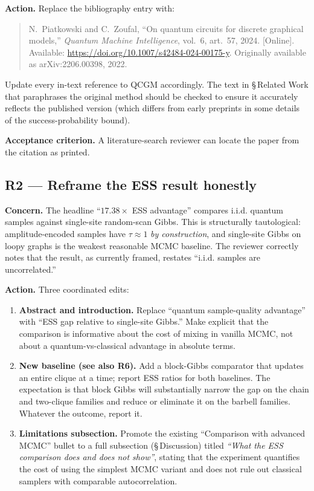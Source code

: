 \documentclass[conference,10pt]{IEEEtran}
\begin{document}
\textbf{Action.} Replace the bibliography entry with:
\begin{quote}\small
N.~Piatkowski and C.~Zoufal, ``On quantum circuits for discrete graphical
models,'' \emph{Quantum Machine Intelligence}, vol.~6, art.~57, 2024.
[Online]. Available: \url{https://doi.org/10.1007/s42484-024-00175-y}.
Originally available as arXiv:2206.00398, 2022.
\end{quote}
Update every in-text reference to QCGM accordingly. The text in
\S\,Related Work that paraphrases the original method should be checked
to ensure it accurately reflects the published version (which differs
from early preprints in some details of the success-probability bound).

\textbf{Acceptance criterion.} A literature-search reviewer can locate the
paper from the citation as printed.

\subsection{R2 --- Reframe the ESS result honestly}

\textbf{Concern.} The headline ``$17.38\times$ ESS advantage'' compares
i.i.d. quantum samples against single-site random-scan Gibbs. This is
structurally tautological: amplitude-encoded samples have $\tau \approx 1$
\emph{by construction}, and single-site Gibbs on loopy graphs is the
weakest reasonable MCMC baseline. The reviewer correctly notes that the
result, as currently framed, restates ``i.i.d. samples are uncorrelated.''

\textbf{Action.} Three coordinated edits:
\begin{enumerate}[leftmargin=*]
    \item \textbf{Abstract and introduction.} Replace ``quantum sample-quality
    advantage'' with ``ESS gap relative to single-site Gibbs.'' Make explicit
    that the comparison is informative about the cost of mixing in vanilla
    MCMC, not about a quantum-vs-classical advantage in absolute terms.
    \item \textbf{New baseline (see also R6).} Add a block-Gibbs comparator
    that updates an entire clique at a time; report ESS ratios for both
    baselines. The expectation is that block Gibbs will substantially
    narrow the gap on the chain and two-clique families and reduce or
    eliminate it on the barbell families. Whatever the outcome, report it.
    \item \textbf{Limitations subsection.} Promote the existing
    ``Comparison with advanced MCMC'' bullet to a full subsection
    (\S\,Discussion) titled \emph{``What the ESS comparison does and does
    not show''}, stating that the experiment quantifies the cost of using
    the simplest MCMC variant and does not rule out classical samplers
    with comparable autocorrelation.
\end{enumerate}
\end{document}
